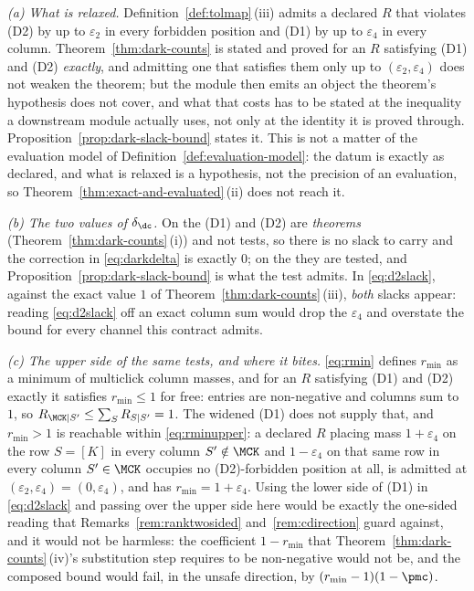 \begin{remark}\label{rem:d2slack}
\emph{(a) What is relaxed.} Definition~\ref{def:tolmap}\,(iii) admits a
declared $R$ that violates (D2) by up to $\varepsilon_2$ in every forbidden
position and (D1) by up to $\varepsilon_4$ in every column.
Theorem~\ref{thm:dark-counts} is stated and proved for an $R$ satisfying (D1) and (D2)
\emph{exactly}, and admitting one that satisfies them only up to
$(\varepsilon_2,\varepsilon_4)$ does not weaken the theorem; but the module then
emits an object the theorem's hypothesis does not cover, and what that costs
has to be stated at the inequality a downstream module actually uses, not only
at the identity it is proved through. Proposition~\ref{prop:dark-slack-bound}
states it. This is not a matter of the evaluation model of
Definition~\ref{def:evaluation-model}: the datum is
exactly as declared, and what is relaxed is a hypothesis, not the precision of
an evaluation, so Theorem~\ref{thm:exact-and-evaluated}\,(ii) does not reach it.

\emph{(b) The two values of $\delta_{\dc}$.} On the
 (D1) and (D2) are \emph{theorems}
(Theorem~\ref{thm:dark-counts}\,(i)) and not tests, so there is no slack to carry and
the correction in \eqref{eq:darkdelta} is exactly $0$; on the
 they are tested, and
Proposition~\ref{prop:dark-slack-bound} is what the test admits. In
\eqref{eq:d2slack}, against the exact value $1$ of
Theorem~\ref{thm:dark-counts}\,(iii), \emph{both} slacks appear: reading
\eqref{eq:d2slack} off an exact column sum would drop the $\varepsilon_4$ and
overstate the bound for every channel this contract admits.

\emph{(c) The upper side of the same tests, and where it bites.}
\eqref{eq:rmin} defines $r_{\min}$ as a minimum of multiclick column masses, and
for an $R$ satisfying (D1) and (D2) exactly it satisfies $r_{\min}\le1$ for
free: entries are non-negative and columns sum to $1$, so
$R_{\MCK|S'}\le\sum_SR_{S|S'}=1$. The widened (D1) does not supply that, and
$r_{\min}>1$ is reachable within \eqref{eq:rminupper}: a declared $R$ placing
mass $1+\varepsilon_4$ on the row $S=[K]$ in every column $S'\notin\MCK$ and
$1-\varepsilon_4$ on that same row in every column $S'\in\MCK$ occupies no
(D2)-forbidden position at all, is admitted at
$(\varepsilon_2,\varepsilon_4)=(0,\varepsilon_4)$, and has
$r_{\min}=1+\varepsilon_4$. Using the lower side of (D1) in \eqref{eq:d2slack}
and passing over the upper side here would be exactly the one-sided reading
that Remarks~\ref{rem:ranktwosided} and~\ref{rem:cdirection} guard against,
and it would not be harmless: the coefficient $1-r_{\min}$ that
Theorem~\ref{thm:dark-counts}\,(iv)'s substitution step requires to be non-negative
would not be, and the composed bound would fail, in the unsafe direction, by
$(r_{\min}-1)(1-\pmc)$.


\end{remark}
